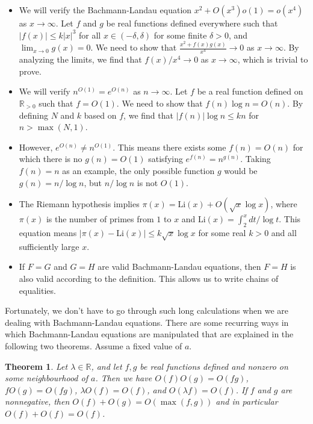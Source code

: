 \documentclass[9pt]{report}
\newtheorem{theorem}{Theorem}
\theoremstyle{definition}
\newcommand\RR{\mathbb R}
\newcommand\abs[1]{\left\lvert#1\right\rvert}
\newcommand\Li{\mathrm{Li}}
\begin{document}
\begin{itemize}
    \item We will verify the Bachmann-Landau equation \(x^2 + O(x^3)o(1) = o(x^4)\) as \(x\to\infty\). Let \(f\) and \(g\) be real functions defined everywhere such that \(\abs{f(x)} \leq k\abs{x}^3\) for all \(x\in(-\delta,\delta)\) for some finite \(\delta>0\), and \(\lim_{x\to 0} g(x) = 0\). We need to show that \(\frac{x^2 + f(x)g(x)}{x^4}\to 0\) as \(x\to\infty\). By analyzing the limits, we find that \(f(x)/x^4 \to 0\) as \(x\to\infty\), which is trivial to prove.

    \item We will verify \(n^{O(1)} = e^{O(n)}\) as \(n\to\infty\). Let \(f\) be a real function defined on \(\RR_{>0}\) such that \(f = O(1)\). We need to show that \(f(n)\log n = O(n)\). By defining \(N\) and \(k\) based on \(f\), we find that \(\abs{f(n)}\log n \le kn\) for \(n > \max(N,1)\).

    \item However, \(e^{O(n)} \ne n^{O(1)}\). This means there exists some \(f(n) = O(n)\) for which there is no \(g(n) = O(1)\) satisfying \(e^{f(n)} = n^{g(n)}\). Taking \(f(n) = n\) as an example, the only possible function \(g\) would be \(g(n) = n/\log n\), but \(n/\log n\) is not \(O(1)\).

    \item The Riemann hypothesis implies \(\pi(x) = \Li(x) + O(\sqrt x \log x)\), where \(\pi(x)\) is the number of primes from \(1\) to \(x\) and \(\Li(x) = \int_2^x dt/\log t\). This equation means \(\abs{\pi(x) - \Li(x)} \le k\sqrt x \log x\) for some real \(k>0\) and all sufficiently large \(x\).

    \item If \(F=G\) and \(G=H\) are valid Bachmann-Landau equations, then \(F=H\) is also valid according to the definition. This allows us to write chains of equalities.
\end{itemize}


Fortunately, we don't have to go through such long calculations when we are dealing with Bachmann-Landau equations.
There are some recurring ways in which Bachmann-Landau equations are manipulated that are explained in the following two theorems.
Assume a fixed value of \(a\).

\begin{theorem}
    Let \(\lambda\in\RR\), and let \(f,g\) be real functions defined and nonzero on some neighbourhood of \(a\).
    Then we have \(O(f)O(g) = O(fg)\), \(fO(g) = O(fg)\), \(\lambda O(f) = O(f)\), and \(O(\lambda f) = O(f)\).
    If \(f\) and \(g\) are nonnegative, then \(O(f) + O(g) = O(\max(f, g))\) and in particular \(O(f) + O(f) = O(f)\).
\end{theorem}
\end{document}
